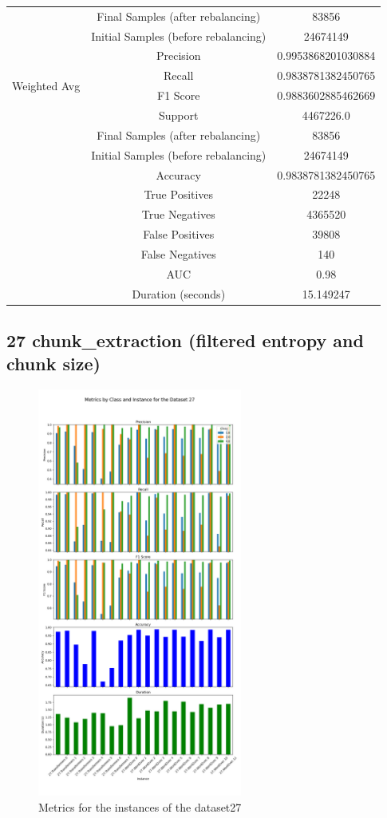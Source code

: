 \begin{longtable}{|c|c|c|}
 & Final Samples (after rebalancing) & 83856 \\
 & Initial Samples (before rebalancing) & 24674149 \\
\hline
\multirow{4}{*}{Weighted Avg} & Precision & 0.9953868201030884 \\
 & Recall & 0.9838781382450765 \\
 & F1 Score & 0.9883602885462669 \\
 & Support & 4467226.0 \\
 & Final Samples (after rebalancing) & 83856 \\
 & Initial Samples (before rebalancing) & 24674149 \\
\hline
& Accuracy & 0.9838781382450765 \\ \hline
& True Positives & 22248 \\ \hline
& True Negatives & 4365520 \\ \hline
& False Positives & 39808 \\ \hline
& False Negatives & 140 \\ \hline
& AUC & 0.98 \\ \hline
& Duration (seconds) & 15.149247 \\ \hline
\end{longtable}


\subsection{27 chunk\_extraction (filtered entropy and chunk size)}

\begin{figure}[H]
\centering
\includegraphics[width=0.6\textwidth]{img/annexes/27/27 - Metrics.png}
\caption{Metrics for the instances of the dataset27}
\label{fig:27_metrics_instance}
\end{figure}

